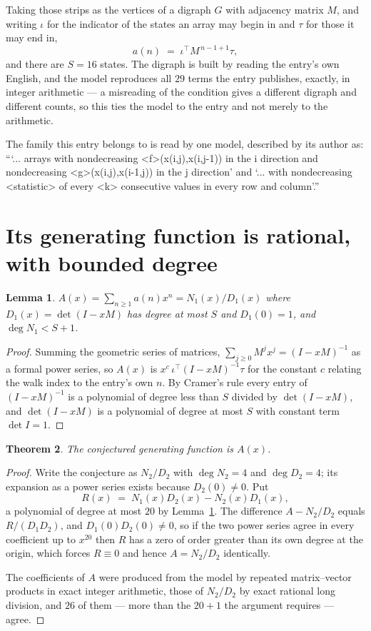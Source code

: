 \documentclass[11pt,a4paper]{article}
\theoremstyle{plain}
\newtheorem{theorem}{Theorem}
\newtheorem{lemma}[theorem]{Lemma}
\theoremstyle{definition}
\begin{document}
Taking those strips as the vertices of a digraph $G$ with adjacency matrix $M$, and writing
$\iota$ for the indicator of the states an array may begin in and $\tau$ for those it may end
in,
\[
a(n)\;=\;\iota^{\!\top}M^{\,n-1+1}\tau ,
\]
and there are $S=16$ states. The digraph is built by reading the entry's own English, and the
model reproduces all $29$ terms the entry publishes, exactly, in integer arithmetic --- a
misreading of the condition gives a different digraph and different counts, so this ties the
model to the entry and not merely to the arithmetic.

The family this entry belongs to is read by one model, described by its author as: ```... arrays with nondecreasing <f>(x(i,j),x(i,j-1)) in the i direction and nondecreasing <g>(x(i,j),x(i-1,j)) in the j direction' and `... with nondecreasing <statistic> of every <k> consecutive values in every row and column'.''


\section{Its generating function is rational, with bounded degree}

\begin{lemma}\label{lem:rat}
$A(x)=\sum_{n\ge1}a(n)x^n=N_1(x)/D_1(x)$ where $D_1(x)=\det(I-xM)$ has degree at most
$S$ and $D_1(0)=1$, and $\deg N_1<S+1$.
\end{lemma}

\begin{proof}
Summing the geometric series of matrices, $\sum_{j\ge0}M^jx^j=(I-xM)^{-1}$ as a formal
power series, so $A(x)$ is $x^{c}\,\iota^{\!\top}(I-xM)^{-1}\tau$ for the constant $c$
relating the walk index to the entry's own $n$. By Cramer's rule every entry of
$(I-xM)^{-1}$ is a polynomial of degree less than $S$ divided by $\det(I-xM)$, and
$\det(I-xM)$ is a polynomial of degree at most $S$ with constant term $\det I=1$.
\end{proof}

\begin{theorem}
The conjectured generating function is $A(x)$.
\end{theorem}

\begin{proof}
Write the conjecture as $N_2/D_2$ with $\deg N_2=4$ and $\deg D_2=4$; its expansion as a
power series exists because $D_2(0)\neq0$. Put
\[
R(x)\;=\;N_1(x)D_2(x)-N_2(x)D_1(x),
\]
a polynomial of degree at most $20$ by Lemma~\ref{lem:rat}. The difference
$A-N_2/D_2$ equals $R/(D_1D_2)$, and $D_1(0)D_2(0)\neq0$, so if the two power series agree in
every coefficient up to $x^{20}$ then $R$ has a zero of order greater than its own
degree at the origin, which forces $R\equiv0$ and hence $A=N_2/D_2$ identically.

The coefficients of $A$ were produced from the model by repeated matrix--vector products in
exact integer arithmetic, those of $N_2/D_2$ by exact rational long division, and $26$
of them --- more than the $20+1$ the argument requires --- agree.
\end{proof}
\end{document}
